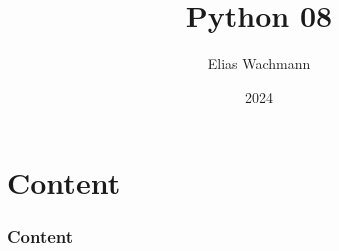 \documentclass{beamer}
\title[]
{Python 08}
\author[E.~Wachmann]{\scriptsize Elias Wachmann
}
\date{2024} %
\institute[Institute of Theoretical and Computational Physics]
{
}
\begin{document}
\titleframe


\section*{Content}

\begin{frame}
\frametitle{Content}
  \tableofcontents
\end{frame}

\end{document}
